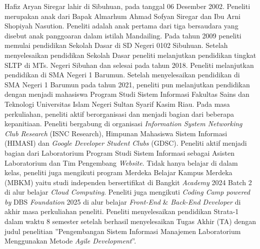 Hafiz Aryan Siregar lahir di Sibuhuan, pada tanggal 06 Desember 2002. Peneliti merupakan anak dari Bapak Almarhum Ahmad Sofyan Siregar dan Ibu Arni Shopiyah Nasution. Peneliti adalah anak pertama dari tiga bersaudara yang disebut anak panggoaran dalam istilah Mandailing. Pada tahun 2009 peneliti memulai pendidikan Sekolah Dasar di SD Negeri 0102 Sibuhuan. Setelah menyelesaikan pendidikan Sekolah Dasar peneliti melanjutkan pendidikan tingkat SLTP di MTs. Negeri Sibuhan dan selesai pada tahun 2018. Peneliti melanjutkan pendidikan di SMA Negeri 1 Barumun. Setelah menyelesaikan pendidikan di SMA Negeri 1 Barumun pada tahun 2021, peneliti pun melanjutkan pendidikan dengan menjadi mahasiswa Program Studi Sistem Informasi Fakultas Sains dan Teknologi Universitas Islam Negeri Sultan Syarif Kasim Riau. Pada masa perkuliahan, peneliti aktif berorganisasi dan menjadi bagian dari beberapa kepanitiaan. Peneliti bergabung di organisasi \textit{Information System Networking Club Research} (ISNC Research), Himpunan Mahasiswa Sistem Informasi (HIMASI) dan \textit{Google Developer Student Clubs} (GDSC). Peneliti aktif menjadi bagian dari Laboratorium Program Studi Sistem Informasi sebagai Asisten Laboratorium dan Tim Pengembang \textit{Website}. Tidak hanya belajar di dalam kelas, peneliti juga mengikuti program Merdeka Belajar Kampus Merdeka (MBKM) yaitu studi independen bersertifikat di Bangkit \textit{Academy} 2024 Batch 2 di alur belajar \textit{Cloud Computing}. Peneliti juga mengikuti \textit{Coding Camp powered by} DBS \textit{Foundation} 2025 di alur belajar \textit{Front-End} \& \textit{Back-End Developer} di akhir masa perkuliahan peneliti. Peneliti menyelesaikan pendidikan Strata-1 dalam waktu 8 semester setelah berhasil menyelesaikan Tugas Akhir (TA) dengan judul penelitian ”Pengembangan Sistem Informasi Manajemen Laboratorium Menggunakan Metode \textit{Agile Development}”.